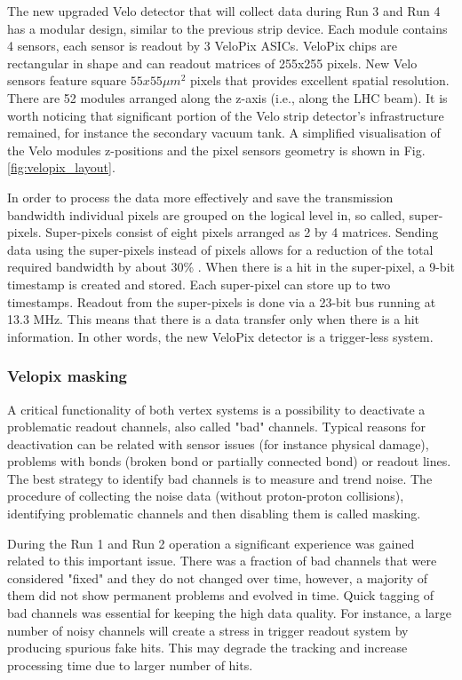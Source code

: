 The new upgraded Velo detector that will collect data during Run 3 and Run 4 has a modular design, similar to the previous strip device. Each module contains 4 sensors, each sensor is readout by
3 VeloPix ASICs. VeloPix chips are rectangular in shape and can readout matrices of 255x255 pixels.
New Velo sensors feature square $55 x 55 \mu m^{2}$ pixels that provides excellent spatial resolution. 
There are 52 modules arranged along the z-axis (i.e., along the LHC beam). It is worth noticing that significant portion of the Velo strip detector's infrastructure remained, for instance the secondary vacuum tank.
A simplified visualisation of the Velo modules z-positions and the pixel sensors geometry is shown in Fig. \ref{fig:velopix_layout}.

In order to process the data more effectively and save the transmission bandwidth individual pixels are grouped on the logical level in, so called, super-pixels.
Super-pixels consist of eight pixels arranged as 2 by 4 matrices.
Sending data using the super-pixels instead of pixels allows for a reduction of the total required bandwidth by about 30\% \cite{Collaboration:1624070}.
When there is a hit in the super-pixel, a 9-bit timestamp is created and stored.
Each super-pixel can store up to two timestamps.
Readout from the super-pixels is done via a 23-bit bus running at 13.3 MHz.
This means that there is a data transfer only when there is a hit information. In other words, the new VeloPix detector is a trigger-less system.

\subsubsection{Velopix masking}
\label{chap2:velopix_calibration}

A critical functionality of both vertex systems is a possibility to deactivate a problematic readout channels, also called "bad" channels. Typical reasons for deactivation can be related with sensor issues (for instance physical damage), problems with bonds (broken bond or partially connected bond) or readout lines. The best strategy to identify bad channels is to measure and trend noise.
The procedure of collecting the noise data (without proton-proton collisions), identifying problematic channels and then disabling them is called masking.

During the Run 1 and Run 2 operation a significant experience was gained related to this important issue. There was a fraction of bad channels that were considered "fixed" and they do not changed over time, however, a majority of them did not show permanent problems and evolved in time. 
Quick tagging of bad channels was essential for keeping the high data quality. 
For instance, a large number of noisy channels will create a stress in trigger readout system by producing spurious fake hits. This may degrade the tracking and increase processing time due to larger number of hits. 

